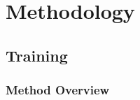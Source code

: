 \chapter{Methodology}
\lipsum[1-2]


\section{Training}
\lipsum[1]

\subsection{Method Overview}
\lipsum[1-2]
